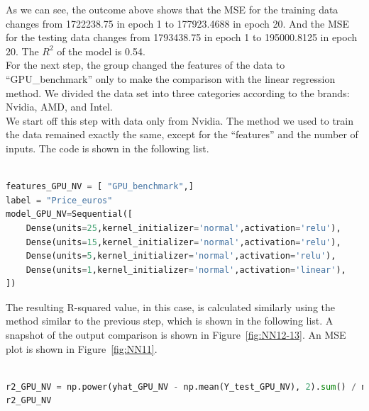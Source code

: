 \documentclass{scrartcl}
\begin{document}
\noindent As we can see, the outcome above shows that the MSE for the training data changes from 1722238.75 in epoch 1 to 177923.4688 in epoch 20. And the MSE for the testing data changes from 1793438.75 in epoch 1 to 195000.8125 in epoch 20. The $R^2$ of the model is 0.54.\\







\noindent For the next step, the group changed the features of the data to “GPU\_benchmark” only to make the comparison with the linear regression method. We divided the data set into three categories according to the brands: Nvidia, AMD, and Intel. \\

\noindent We start off this step with data only from Nvidia. The method we used to train the data remained exactly the same, except for the “features” and the number of inputs. The code is shown in the following list. \\

\begin{lstlisting}[language=Python, caption= Code for training Nvidia data, basicstyle=\tiny,captionpos=b]

features_GPU_NV = [ "GPU_benchmark",]
label = "Price_euros"
model_GPU_NV=Sequential([
    Dense(units=25,kernel_initializer='normal',activation='relu'),
    Dense(units=15,kernel_initializer='normal',activation='relu'),
    Dense(units=5,kernel_initializer='normal',activation='relu'),
    Dense(units=1,kernel_initializer='normal',activation='linear'),
])

\end{lstlisting}


\noindent The resulting R-squared value, in this case, is calculated similarly using the method similar to the previous step, which is shown in the following list. A snapshot of the output comparison is shown in Figure~\ref{fig:NN12-13}. An MSE plot is shown in Figure~\ref{fig:NN11}. \\

\begin{lstlisting}[language=Python, caption= Code output for MSE Nvidia training, basicstyle=\tiny,captionpos=b]

r2_GPU_NV = np.power(yhat_GPU_NV - np.mean(Y_test_GPU_NV), 2).sum() / np.power(Y_test_GPU_NV - np.mean(Y_test_GPU_NV), 2).sum()
r2_GPU_NV
    
\end{lstlisting}
\end{document}
